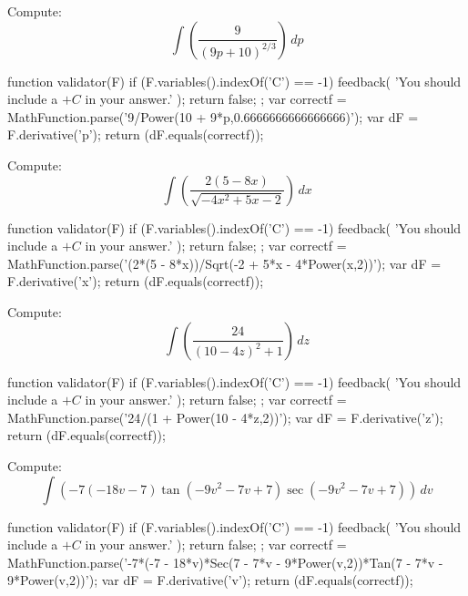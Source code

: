 \documentclass{ximera}
\renewcommand{\d}{\, d}
\begin{document}
\begin{exercise}
Compute: 
\[
\int \left(\frac{9}{(9 p+10)^{2/3}}\right)\d p
\]
\begin{expressionAnswer}
     function validator(F) {
      if (F.variables().indexOf('C') == -1) {
        feedback( 'You should include a $+C$ in your answer.' );
        return false;
      };      
      var correctf = MathFunction.parse('9/Power(10 + 9*p,0.6666666666666666)');
      var dF = F.derivative('p');
      return (dF.equals(correctf));
    }
\end{expressionAnswer}
\end{exercise}



\begin{exercise}
Compute: 
\[
\int \left(\frac{2 (5-8 x)}{\sqrt{-4 x^2+5 x-2}}\right)\d x
\]
\begin{expressionAnswer}
     function validator(F) {
      if (F.variables().indexOf('C') == -1) {
        feedback( 'You should include a $+C$ in your answer.' );
        return false;
      };      
      var correctf = MathFunction.parse('(2*(5 - 8*x))/Sqrt(-2 + 5*x - 4*Power(x,2))');
      var dF = F.derivative('x');
      return (dF.equals(correctf));
    }
\end{expressionAnswer}
\end{exercise}



\begin{exercise}
Compute: 
\[
\int \left(\frac{24}{(10-4 z)^2+1}\right)\d z
\]
\begin{expressionAnswer}
     function validator(F) {
      if (F.variables().indexOf('C') == -1) {
        feedback( 'You should include a $+C$ in your answer.' );
        return false;
      };      
      var correctf = MathFunction.parse('24/(1 + Power(10 - 4*z,2))');
      var dF = F.derivative('z');
      return (dF.equals(correctf));
    }
\end{expressionAnswer}
\end{exercise}



\begin{exercise}
Compute: 
\[
\int \left(-7 (-18 v-7) \tan \left(-9 v^2-7 v+7\right) \sec \left(-9 v^2-7 v+7\right)\right)\d v
\]
\begin{expressionAnswer}
     function validator(F) {
      if (F.variables().indexOf('C') == -1) {
        feedback( 'You should include a $+C$ in your answer.' );
        return false;
      };      
      var correctf = MathFunction.parse('-7*(-7 - 18*v)*Sec(7 - 7*v - 9*Power(v,2))*Tan(7 - 7*v - 9*Power(v,2))');
      var dF = F.derivative('v');
      return (dF.equals(correctf));
    }
\end{expressionAnswer}
\end{exercise}
\end{document}
